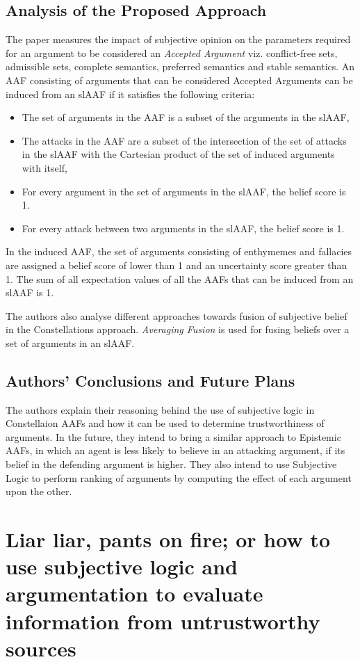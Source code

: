 \documentclass[UTF8]{article}
\begin{document}
\subsection{Analysis of the Proposed Approach}
The paper measures the impact of subjective opinion on the parameters required for an argument to be considered an \textit{Accepted Argument} viz. conflict-free sets, admissible sets, complete semantics, preferred semantics
and stable semantics. An AAF consisting of arguments that can be considered Accepted Arguments can be induced from an slAAF if it satisfies the 
following criteria:
\begin{itemize}
  \item The set of arguments in the AAF is a subset of the arguments in the slAAF,
  \item The attacks in the AAF are a subset of the intersection of the set of attacks in the slAAF with the Cartesian product of the set of induced arguments with itself,
  \item For every argument in the set of arguments in the slAAF, the belief score is 1.
  \item For every attack between two arguments in the slAAF, the belief score is 1.
\end{itemize}
In the induced AAF, the set of 
arguments consisting of enthymemes and fallacies are assigned a belief score of lower than 1 and an uncertainty score greater than 1. The sum of all expectation values of all the AAFs that can be induced from an slAAF is 1.

The authors also analyse different approaches towards fusion of subjective belief in the Constellations approach. \textit{Averaging Fusion} is used for fusing beliefs over a set of arguments in an slAAF.

\subsection{Authors' Conclusions and Future Plans}
The authors explain their reasoning behind the use of subjective logic in Constellaion AAFs and how it can be used to determine trustworthiness
of arguments. In the future, they intend to bring a similar approach to Epistemic AAFs, in which an agent is less likely to believe in an attacking argument, 
if its belief in the defending argument is higher. They also intend to use Subjective Logic to perform ranking of arguments by 
computing the effect of each argument upon the other.

\section{Liar liar, pants on fire; or how to use subjective logic and argumentation to
evaluate information from untrustworthy sources}
\end{document}
